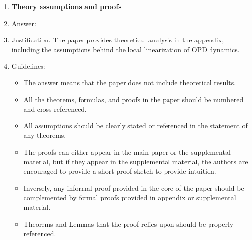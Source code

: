 \documentclass{article}
\begin{document}
\begin{enumerate}
\item {\bf Theory assumptions and proofs}
    \item[] Answer: \answerYes{}
    \item[] Justification: The paper provides theoretical analysis in the appendix, including the assumptions behind the local linearization of OPD dynamics.
    \item[] Guidelines:
    \begin{itemize}
        \item The answer \answerNA{} means that the paper does not include theoretical results. 
        \item All the theorems, formulas, and proofs in the paper should be numbered and cross-referenced.
        \item All assumptions should be clearly stated or referenced in the statement of any theorems.
        \item The proofs can either appear in the main paper or the supplemental material, but if they appear in the supplemental material, the authors are encouraged to provide a short proof sketch to provide intuition. 
        \item Inversely, any informal proof provided in the core of the paper should be complemented by formal proofs provided in appendix or supplemental material.
        \item Theorems and Lemmas that the proof relies upon should be properly referenced. 
    \end{itemize}



\end{enumerate}
\end{document}
